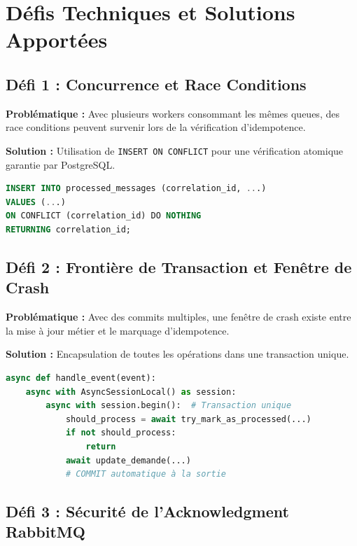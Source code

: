 \documentclass[12pt,a4paper]{article}
\begin{document}
\section{Défis Techniques et Solutions Apportées}

\subsection{Défi 1 : Concurrence et Race Conditions}

\textbf{Problématique :} Avec plusieurs workers consommant les mêmes queues, des race conditions peuvent survenir lors de la vérification d'idempotence.

\textbf{Solution :} Utilisation de \texttt{INSERT ON CONFLICT} pour une vérification atomique garantie par PostgreSQL.

\begin{lstlisting}[language=SQL]
INSERT INTO processed_messages (correlation_id, ...)
VALUES (...)
ON CONFLICT (correlation_id) DO NOTHING
RETURNING correlation_id;
\end{lstlisting}

\subsection{Défi 2 : Frontière de Transaction et Fenêtre de Crash}

\textbf{Problématique :} Avec des commits multiples, une fenêtre de crash existe entre la mise à jour métier et le marquage d'idempotence.

\textbf{Solution :} Encapsulation de toutes les opérations dans une transaction unique.

\begin{lstlisting}[language=Python]
async def handle_event(event):
    async with AsyncSessionLocal() as session:
        async with session.begin():  # Transaction unique
            should_process = await try_mark_as_processed(...)
            if not should_process:
                return
            await update_demande(...)
            # COMMIT automatique à la sortie
\end{lstlisting}

\subsection{Défi 3 : Sécurité de l'Acknowledgment RabbitMQ}
\end{document}
